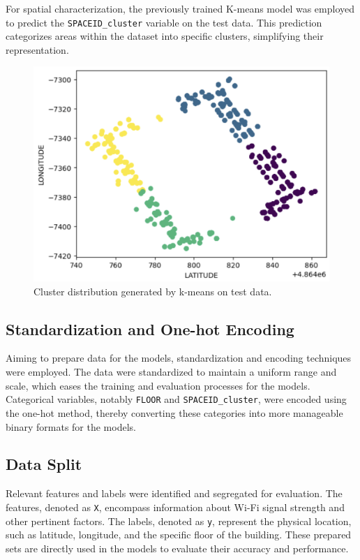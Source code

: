 \documentclass[conference]{IEEEtran}
\begin{document}
For spatial characterization, the previously trained K-means model was employed to predict the \texttt{SPACEID\_cluster} variable on the test data. This prediction categorizes areas within the dataset into specific clusters, simplifying their representation.

\begin{figure}[h]
    \centering
    \includegraphics[width=0.7\linewidth]{procesamientoypruebadatos.png}
    \caption{Cluster distribution generated by k-means on test data.}
    \label{fig:clusters_test_data}
\end{figure}

\subsection{Standardization and One-hot Encoding}

Aiming to prepare data for the models, standardization and encoding techniques were employed. The data were standardized to maintain a uniform range and scale, which eases the training and evaluation processes for the models. Categorical variables, notably \texttt{FLOOR} and \texttt{SPACEID\_cluster}, were encoded using the one-hot method, thereby converting these categories into more manageable binary formats for the models.

\subsection{Data Split}

Relevant features and labels were identified and segregated for evaluation. The features, denoted as \texttt{X}, encompass information about Wi-Fi signal strength and other pertinent factors. The labels, denoted as \texttt{y}, represent the physical location, such as latitude, longitude, and the specific floor of the building. These prepared sets are directly used in the models to evaluate their accuracy and performance.
\end{document}
